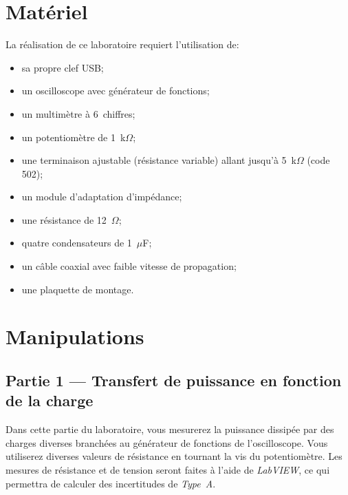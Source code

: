 \documentclass[canadien,12pt,oneside,letterpaper]{article}
\begin{document}
\vspace{1ex}
\noindent{}


\section{Matériel} \label{sec:mat}

\noindent La réalisation de ce laboratoire requiert l'utilisation de:
\vspace{1ex}
\begin{itemize} \itemsep4pt
\item sa propre clef USB;
\item un oscilloscope avec générateur de fonctions;
\item un multimètre à 6\textonehalf~chiffres;
\item un potentiomètre de 1~k$\Omega$;
\item une terminaison ajustable (résistance variable) allant jusqu'à 5~k$\Omega$ (code 502);
\item un module d'adaptation d'impédance;
\item une résistance de 12~$\Omega$;
\item quatre condensateurs de 1~$\mu$F;
\item un câble coaxial avec faible vitesse de propagation;
\item une plaquette de montage.
\end{itemize}


\section{Manipulations}

\subsection{Partie 1 --- Transfert de puissance en fonction de la charge}

Dans cette partie du laboratoire, vous mesurerez la puissance dissipée par des charges diverses branchées au générateur de fonctions de l'oscilloscope. Vous utiliserez diverses valeurs de résistance en tournant la vis du potentiomètre. Les mesures de résistance et de tension seront faites à l'aide de \textit{LabVIEW}, ce qui permettra de calculer des incertitudes de \textit{Type~A}.
\end{document}
